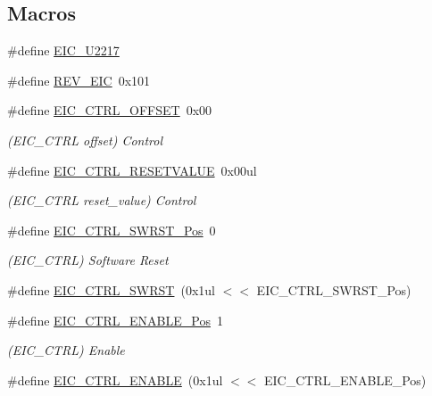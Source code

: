 \subsection*{Macros}
\begin{DoxyCompactItemize}
\item 
\#define \mbox{\hyperlink{group___s_a_m_d21___e_i_c_gadfade8e25dd47920190c67452bfde1d9}{E\+I\+C\+\_\+\+U2217}}
\item 
\#define \mbox{\hyperlink{group___s_a_m_d21___e_i_c_ga903f62b04b916a92b23d16735a1569da}{R\+E\+V\+\_\+\+E\+IC}}~0x101
\item 
\#define \mbox{\hyperlink{group___s_a_m_d21___e_i_c_ga54b8dc9939741d73cafffb3faf0fb653}{E\+I\+C\+\_\+\+C\+T\+R\+L\+\_\+\+O\+F\+F\+S\+ET}}~0x00
\begin{DoxyCompactList}\small\item\em (E\+I\+C\+\_\+\+C\+T\+RL offset) Control \end{DoxyCompactList}\item 
\#define \mbox{\hyperlink{group___s_a_m_d21___e_i_c_ga25bdb39b0de222dd212167e080c13ff7}{E\+I\+C\+\_\+\+C\+T\+R\+L\+\_\+\+R\+E\+S\+E\+T\+V\+A\+L\+UE}}~0x00ul
\begin{DoxyCompactList}\small\item\em (E\+I\+C\+\_\+\+C\+T\+RL reset\+\_\+value) Control \end{DoxyCompactList}\item 
\#define \mbox{\hyperlink{group___s_a_m_d21___e_i_c_gaa54031c7addc659dba8a92598c7460f9}{E\+I\+C\+\_\+\+C\+T\+R\+L\+\_\+\+S\+W\+R\+S\+T\+\_\+\+Pos}}~0
\begin{DoxyCompactList}\small\item\em (E\+I\+C\+\_\+\+C\+T\+RL) Software Reset \end{DoxyCompactList}\item 
\#define \mbox{\hyperlink{group___s_a_m_d21___e_i_c_gab75d09d92fb6fa516bf44e033dde9c59}{E\+I\+C\+\_\+\+C\+T\+R\+L\+\_\+\+S\+W\+R\+ST}}~(0x1ul $<$$<$ E\+I\+C\+\_\+\+C\+T\+R\+L\+\_\+\+S\+W\+R\+S\+T\+\_\+\+Pos)
\item 
\#define \mbox{\hyperlink{group___s_a_m_d21___e_i_c_ga3c030b3c5815c0a09eb01394a22db9e2}{E\+I\+C\+\_\+\+C\+T\+R\+L\+\_\+\+E\+N\+A\+B\+L\+E\+\_\+\+Pos}}~1
\begin{DoxyCompactList}\small\item\em (E\+I\+C\+\_\+\+C\+T\+RL) Enable \end{DoxyCompactList}\item 
\#define \mbox{\hyperlink{group___s_a_m_d21___e_i_c_gad426e6bb13bf7968cf5ebd9537c69d59}{E\+I\+C\+\_\+\+C\+T\+R\+L\+\_\+\+E\+N\+A\+B\+LE}}~(0x1ul $<$$<$ E\+I\+C\+\_\+\+C\+T\+R\+L\+\_\+\+E\+N\+A\+B\+L\+E\+\_\+\+Pos)

\end{DoxyCompactItemize}
